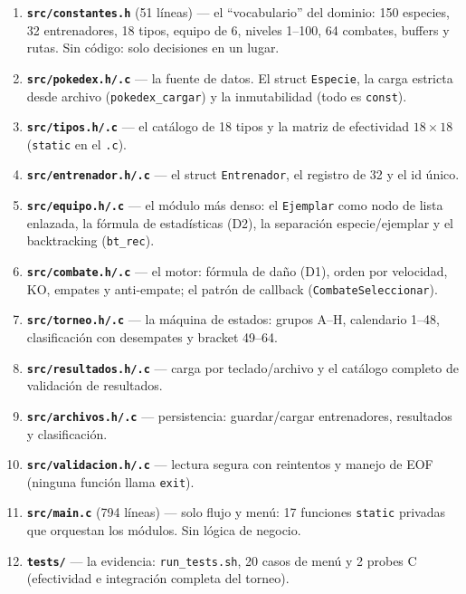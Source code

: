 \documentclass[11pt,a4paper]{article}
\begin{document}
\begin{enumerate}[leftmargin=1.6em]
\item \textbf{\texttt{src/constantes.h}} (51 l\'ineas) — el ``vocabulario'' del
  dominio: 150 especies, 32 entrenadores, 18 tipos, equipo de 6, niveles 1--100,
  64 combates, buffers y rutas. Sin c\'odigo: solo decisiones en un lugar.
\item \textbf{\texttt{src/pokedex.h/.c}} — la fuente de datos. El struct
  \texttt{Especie}, la carga estricta desde archivo (\texttt{pokedex\_cargar})
  y la inmutabilidad (todo es \texttt{const}).
\item \textbf{\texttt{src/tipos.h/.c}} — el cat\'alogo de 18 tipos y la matriz
  de efectividad $18\times18$ (\texttt{static} en el \texttt{.c}).
\item \textbf{\texttt{src/entrenador.h/.c}} — el struct \texttt{Entrenador}, el
  registro de 32 y el id \'unico.
\item \textbf{\texttt{src/equipo.h/.c}} — el m\'odulo m\'as denso: el
  \texttt{Ejemplar} como nodo de lista enlazada, la f\'ormula de estad\'isticas
  (D2), la separaci\'on especie/ejemplar y el backtracking (\texttt{bt\_rec}).
\item \textbf{\texttt{src/combate.h/.c}} — el motor: f\'ormula de da\~no (D1),
  orden por velocidad, KO, empates y anti-empate; el patr\'on de callback
  (\texttt{CombateSeleccionar}).
\item \textbf{\texttt{src/torneo.h/.c}} — la m\'aquina de estados: grupos A--H,
  calendario 1--48, clasificaci\'on con desempates y bracket 49--64.
\item \textbf{\texttt{src/resultados.h/.c}} — carga por teclado/archivo y el
  cat\'alogo completo de validaci\'on de resultados.
\item \textbf{\texttt{src/archivos.h/.c}} — persistencia: guardar/cargar
  entrenadores, resultados y clasificaci\'on.
\item \textbf{\texttt{src/validacion.h/.c}} — lectura segura con reintentos y
  manejo de EOF (ninguna funci\'on llama \texttt{exit}).
\item \textbf{\texttt{src/main.c}} (794 l\'ineas) — solo flujo y men\'u: 17
  funciones \texttt{static} privadas que orquestan los m\'odulos. Sin l\'ogica
  de negocio.
\item \textbf{\texttt{tests/}} — la evidencia: \texttt{run\_tests.sh}, 20 casos
  de men\'u y 2 probes C (efectividad e integraci\'on completa del torneo).
\end{enumerate}
\end{document}
